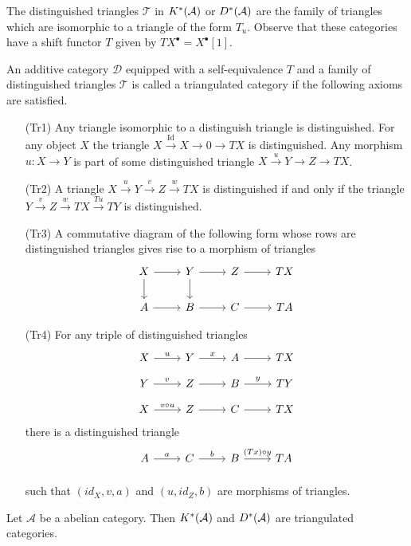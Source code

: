 The distinguished triangles $\mathcal{T}$ in $K^*(\AA)$ or $D^*(\AA)$ are the family of triangles which are isomorphic to a triangle of the form $T_u$.
Observe that these categories have a shift functor $T$ given by $TX^\bullet = X^\bullet[1]$.
\begin{definition}
 An additive category $\mathcal{D}$ equipped with a self-equivalence $T$ and a family of distinguished triangles $\mathcal{T}$ is called a triangulated category if the following axioms are satisfied.
 \begin{enumerate}
   \item[(Tr1)] Any triangle isomorphic to a distinguish triangle is distinguished. For any object $X$ the triangle $X\xrightarrow{\operatorname{Id}} X \to 0 \to TX$ is distinguished.
   Any morphism $u:X\to Y$ is part of some distinguished triangle $X\xrightarrow{u} Y \to Z \to TX$.
   \item[(Tr2)] A triangle $X\xrightarrow{u} Y \xrightarrow{v} Z \xrightarrow{w} TX$ is distinguished if and only if the triangle $Y \xrightarrow{v} Z \xrightarrow{w} TX \xrightarrow{Tu} TY$ is distinguished.
   \item[(Tr3)] A commutative diagram of the following form whose rows are distinguished triangles gives rise to a morphism of triangles
   $$
     \begin{tikzcd}
       X\arrow{d}\rar& Y\arrow{d}\rar & Z\rar & TX\\
       A\rar& B\rar & C\rar & TA
     \end{tikzcd}
    $$
   \item[(Tr4)] For any triple of distinguished triangles
   $$
     \begin{tikzcd}[row sep=small]
       X \arrow{r}{u} & Y \arrow{r}{x}& A \arrow{r}{} & TX \\
       Y \arrow{r}{v} & Z \arrow{r}{}& B \arrow{r}{y} & TY\\
       X \arrow{r}{v\circ u} & Z\arrow{r}{} & C\arrow{r}{} & TX
     \end{tikzcd}
   $$
   there is a distinguished triangle
   $$\begin{tikzcd}[row sep=small]
     A \arrow{r}{a} & C \arrow{r}{b}& B \arrow{r}{(Tx)\circ y} & TA \\
   \end{tikzcd} $$
   such that $(id_X, v,a)$ and $(u,id_Z,b)$ are morphisms of triangles.
   \end{enumerate}
\end{definition}
\begin{proposition}{\cite[Proposition 1.2.4. ]{dimca2004sheaves}}
 Let $\mathcal{A}$ be a abelian category. Then $K^*(\AA)$ and $D^*(\AA)$ are triangulated categories.
\end{proposition}
